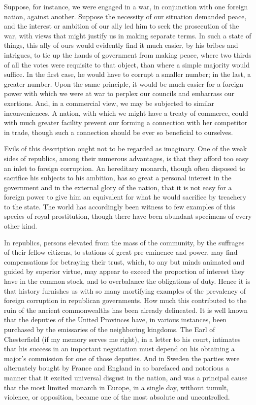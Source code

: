 Suppose, for instance, we were engaged in a war, in conjunction with one foreign nation, against another. Suppose the necessity of our situation demanded peace, and the interest or ambition of our ally led him to seek the prosecution of the war, with views that might justify us in making separate terms. In such a state of things, this ally of ours would evidently find it much easier, by his bribes and intrigues, to tie up the hands of government from making peace, where two thirds of all the votes were requisite to that object, than where a simple majority would suffice. In the first case, he would have to corrupt a smaller number; in the last, a greater number. Upon the same principle, it would be much easier for a foreign power with which we were at war to perplex our councils and embarrass our exertions. And, in a commercial view, we may be subjected to similar inconveniences. A nation, with which we might have a treaty of commerce, could with much greater facility prevent our forming a connection with her competitor in trade, though such a connection should be ever so beneficial to ourselves.

Evils of this description ought not to be regarded as imaginary. One of the weak sides of republics, among their numerous advantages, is that they afford too easy an inlet to foreign corruption. An hereditary monarch, though often disposed to sacrifice his subjects to his ambition, has so great a personal interest in the government and in the external glory of the nation, that it is not easy for a foreign power to give him an equivalent for what he would sacrifice by treachery to the state. The world has accordingly been witness to few examples of this species of royal prostitution, though there have been abundant specimens of every other kind.

In republics, persons elevated from the mass of the community, by the suffrages of their fellow-citizens, to stations of great pre-eminence and power, may find compensations for betraying their trust, which, to any but minds animated and guided by superior virtue, may appear to exceed the proportion of interest they have in the common stock, and to overbalance the obligations of duty. Hence it is that history furnishes us with so many mortifying examples of the prevalency of foreign corruption in republican governments. How much this contributed to the ruin of the ancient commonwealths has been already delineated. It is well known that the deputies of the United Provinces have, in various instances, been purchased by the emissaries of the neighboring kingdoms. The Earl of Chesterfield (if my memory serves me right), in a letter to his court, intimates that his success in an important negotiation must depend on his obtaining a major's commission for one of those deputies. And in Sweden the parties were alternately bought by France and England in so barefaced and notorious a manner that it excited universal disgust in the nation, and was a principal cause that the most limited monarch in Europe, in a single day, without tumult, violence, or opposition, became one of the most absolute and uncontrolled.

